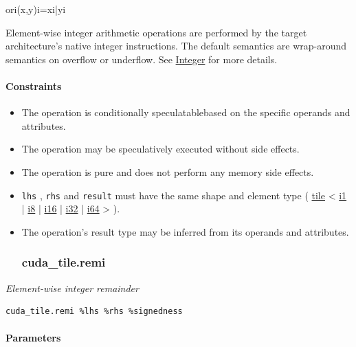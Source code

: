 \documentclass{article}
\begin{document}
ori(x,y)i=xi|yi

Element-wise integer arithmetic operations are performed by the target architecture's native integer instructions. The default semantics are wrap-around semantics on overflow or underflow. See \href{https://docs.nvidia.com/cuda/tile-ir/latest/sections/operations.html#op-group-integer}{Integer} for more details.



\paragraph{Constraints}

\begin{itemize}
\item The operation is conditionally speculatablebased on the specific operands and attributes.
\item The operation may be speculatively executed without side effects.
\item The operation is pure and does not perform any memory side effects.
\item \texttt{lhs} , \texttt{rhs} and \texttt{result} must have the same shape and element type ( \href{https://docs.nvidia.com/cuda/tile-ir/latest/sections/types.html#type-tile}{tile} < \href{https://docs.nvidia.com/cuda/tile-ir/latest/sections/types.html#subsection-element-types}{i1} | \href{https://docs.nvidia.com/cuda/tile-ir/latest/sections/types.html#subsection-element-types}{i8} | \href{https://docs.nvidia.com/cuda/tile-ir/latest/sections/types.html#subsection-element-types}{i16} | \href{https://docs.nvidia.com/cuda/tile-ir/latest/sections/types.html#subsection-element-types}{i32} | \href{https://docs.nvidia.com/cuda/tile-ir/latest/sections/types.html#subsection-element-types}{i64} > ).
\item The operation's result type may be inferred from its operands and attributes.


\subsubsection{cuda\_tile.remi}

\end{itemize}
\textit{Element-wise integer remainder}


\begin{lstlisting}
cuda_tile.remi %lhs %rhs %signedness
\end{lstlisting}

\paragraph{Parameters}
\end{document}
